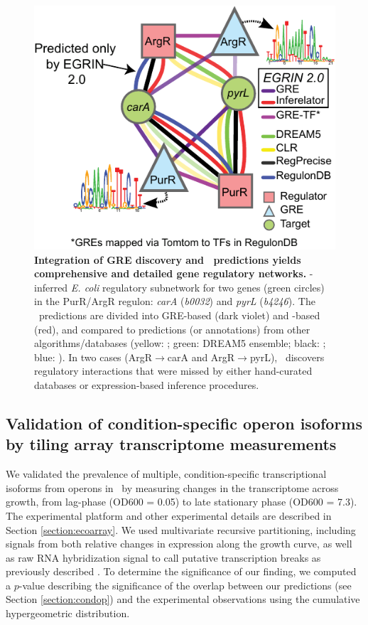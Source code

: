\begin{figure}[hp]
\centering
\includegraphics[width=0.5\linewidth]{figures/argR_purR_networks.pdf}
\caption[Integration of GRE discovery and \nwinf\ predictions yields comprehensive and detailed gene regulatory networks]{\textbf{Integration of GRE discovery and \nwinf\ predictions yields comprehensive and detailed gene regulatory networks.} \egrine-inferred \textit{E. coli} regulatory subnetwork for two genes (green circles) in the PurR/ArgR regulon: \textit{carA} (\textit{b0032}) and \textit{pyrL} (\textit{b4246}). The \egrine~predictions are divided into GRE-based (dark violet) and \nwinf-based (red), and compared to predictions (or annotations) from other algorithms/databases (yellow: ; green: DREAM5 ensemble; black: ; blue: ). In two cases (ArgR$\rightarrow$carA and ArgR$\rightarrow$pyrL), \egrine~discovers regulatory interactions that were missed by either hand-curated databases or expression-based inference procedures.} 
\label{fig:argR_purR_networks}
\end{figure} 

\subsection{Validation of condition-specific operon isoforms by tiling array transcriptome measurements}

We validated the prevalence of multiple, condition-specific transcriptional isoforms from operons in \eco\ by measuring changes in the transcriptome across growth, from lag-phase (OD600 = 0.05) to late stationary phase (OD600 = 7.3). The experimental platform and other experimental details are described in Section \ref{section:ecoarray}. We used multivariate recursive partitioning, including signals from both relative changes in expression along the growth curve, as well as raw RNA hybridization signal to call putative transcription breaks as previously described \cite{koide_prevalence_2009}. To determine the significance of our finding, we computed a $p$-value describing the significance of the overlap between our predictions (see Section \ref{section:condop}) and the experimental observations using the cumulative hypergeometric distribution.

